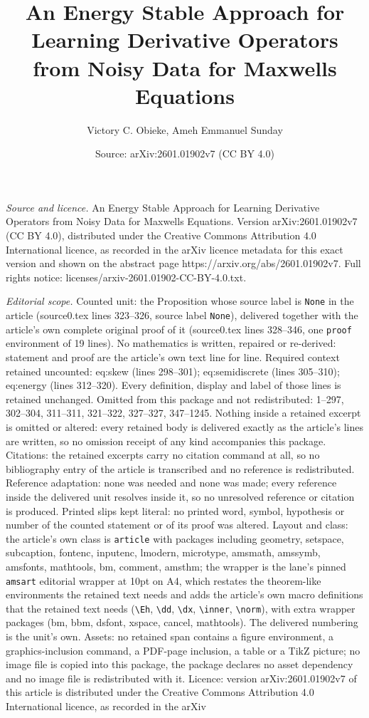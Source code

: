 \documentclass[10pt,a4paper]{amsart}
\title[An Energy Stable Approach for Learning Derivative Operators ]{An Energy Stable Approach for Learning Derivative Operators from Noisy Data for Maxwells Equations}
\author{Victory C. Obieke, Ameh Emmanuel Sunday}
\date{Source: arXiv:2601.01902v7 (CC BY 4.0)}
\begin{document}
\maketitle

\noindent\emph{Source and licence.} An Energy Stable Approach for Learning Derivative Operators from Noisy Data for Maxwells Equations. Version arXiv:2601.01902v7 (CC BY 4.0), distributed under the Creative Commons Attribution 4.0 International licence, as recorded in the arXiv licence metadata for this exact version and shown on the abstract page https://arxiv.org/abs/2601.01902v7. Full rights notice: licenses/arxiv-2601.01902-CC-BY-4.0.txt.\par\smallskip

\noindent\textit{Editorial scope.} Counted unit: the Proposition whose source label is \texttt{None} in the article (source0.tex lines 323--326, source label \texttt{None}), delivered together with the article's own complete original proof of it (source0.tex lines 328--346, one \texttt{proof} environment of 19 lines). No mathematics is written, repaired or re-derived: statement and proof are the article's own text line for line. Required context retained uncounted: eq:skew (lines 298--301); eq:semidiscrete (lines 305--310); eq:energy (lines 312--320). Every definition, display and label of those lines is retained unchanged. Omitted from this package and not redistributed: 1--297, 302--304, 311--311, 321--322, 327--327, 347--1245. Nothing inside a retained excerpt is omitted or altered: every retained body is delivered exactly as the article's lines are written, so no omission receipt of any kind accompanies this package. Citations: the retained excerpts carry no citation command at all, so no bibliography entry of the article is transcribed and no reference is redistributed. Reference adaptation: none was needed and none was made; every reference inside the delivered unit resolves inside it, so no unresolved reference or citation is produced. Printed slips kept literal: no printed word, symbol, hypothesis or number of the counted statement or of its proof was altered. Layout and class: the article's own class is \texttt{article} with packages including geometry, setspace, subcaption, fontenc, inputenc, lmodern, microtype, amsmath, amssymb, amsfonts, mathtools, bm, comment, amsthm; the wrapper is the lane's pinned \texttt{amsart} editorial wrapper at 10pt on A4, which restates the theorem-like environments the retained text needs and adds the article's own macro definitions that the retained text needs (\texttt{\textbackslash Eh}, \texttt{\textbackslash dd}, \texttt{\textbackslash dx}, \texttt{\textbackslash inner}, \texttt{\textbackslash norm}), with extra wrapper packages (bm, bbm, dsfont, xspace, cancel, mathtools). The delivered numbering is the unit's own. Assets: no retained span contains a figure environment, a graphics-inclusion command, a PDF-page inclusion, a table or a TikZ picture; no image file is copied into this package, the package declares no asset dependency and no image file is redistributed with it. Licence: version arXiv:2601.01902v7 of this article is distributed under the Creative Commons Attribution 4.0 International licence, as recorded in the arXiv 
\end{document}
